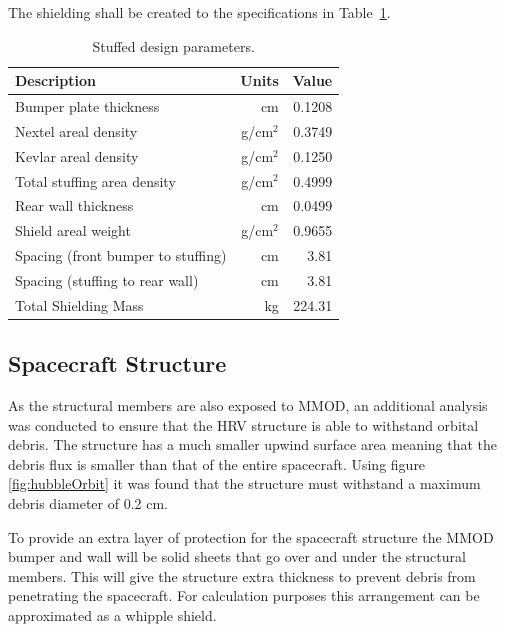 \documentclass[paper=letter, fontsize=11pt]{scrartcl} %
\numberwithin{equation}{section} %
\numberwithin{figure}{section} %
\numberwithin{table}{section} %
\begin{document}
The shielding shall be created to the specifications in Table~\ref{table:stuffedWhippleDesign}.

\begin{table}[H]
\begin{centering}
\begin{tabular}{lrr}
\toprule
Description                        & Units    & Value  \\ \hline
\midrule
Bumper plate thickness             & cm     & 0.1208 \\
Nextel areal density               & g/cm$^2$ & 0.3749 \\
Kevlar areal density               & g/cm$^2$ & 0.1250 \\
Total stuffing area density        & g/cm$^2$ & 0.4999 \\
Rear wall thickness                & cm     & 0.0499 \\
Shield areal weight                & g/cm$^2$ & 0.9655 \\
Spacing (front bumper to stuffing) & cm     & 3.81   \\
Spacing (stuffing to rear wall)    & cm     & 3.81   \\
Total Shielding Mass               & kg     & 224.31 \\
\bottomrule
\end{tabular}
\caption{Stuffed design parameters.}
\label{table:stuffedWhippleDesign}
\end{centering}
\end{table}

\subsection{Spacecraft Structure}
As the structural members are also exposed to MMOD, an additional analysis was conducted to ensure that the HRV structure is able to withstand orbital debris. The structure has a much smaller upwind surface area meaning that the debris flux is smaller than that of the entire spacecraft. Using figure \ref{fig:hubbleOrbit} it was found that the structure must withstand a maximum debris diameter of 0.2 cm.

To provide an extra layer of protection for the spacecraft structure the MMOD bumper and wall will be solid sheets that go over and under the structural members. This will give the structure extra thickness to prevent debris from penetrating the spacecraft. For calculation purposes this arrangement can be approximated as a whipple shield.
\end{document}
